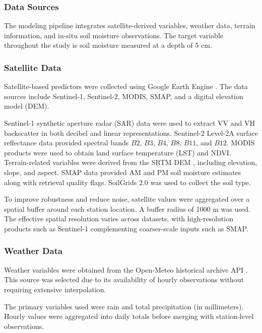 \subsubsection*{Data Sources}

The modeling pipeline integrates satellite-derived variables, weather data, terrain information, and in-situ soil moisture observations. The target variable throughout the study is soil moisture measured at a depth of 5 cm.

\subsubsection*{Satellite Data}
Satellite-based predictors were collected using Google Earth Engine \cite{gee}. The data sources include Sentinel-1, Sentinel-2, MODIS, SMAP, and a digital elevation model (DEM).

Sentinel-1 synthetic aperture radar (SAR) data \cite{sentinel1} were used to extract VV and VH backscatter in both decibel and linear representations. 
Sentinel-2 Level-2A surface reflectance data \cite{sentinel2} provided spectral bands \(B2\), \(B3\), \(B4\), \(B8\), \(B11\), and \(B12\). MODIS products \cite{modis} were used to obtain land surface temperature (LST) and NDVI. Terrain-related variables were derived from the SRTM DEM \cite{srtm}, including elevation, slope, and aspect. 
SMAP data \cite{smap} provided AM and PM soil moisture estimates along with retrieval quality flags. SoilGrids 2.0 \cite{Poggioetal2021} was used to collect the soil type. 

To improve robustness and reduce noise, satellite values were aggregated over a spatial buffer around each station location. A buffer radius of 1000 m was used. The effective spatial resolution varies across datasets, with high-resolution products such as Sentinel-1 complementing coarser-scale inputs such as SMAP.

\subsubsection*{Weather Data}
Weather variables were obtained from the Open-Meteo historical archive API \cite{openmeteo}. This source was selected due to its availability of hourly observations without requiring extensive interpolation.

The primary variables used were rain and total precipitation (in millimeters). Hourly values were aggregated into daily totals before merging with station-level observations.

